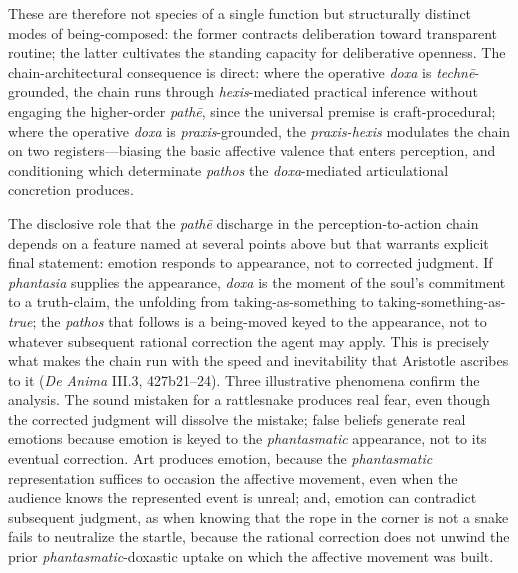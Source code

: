 \documentclass{article}
\begin{document}
These are therefore not species of a single function but structurally distinct modes of being-composed: the former contracts deliberation toward transparent routine; the latter cultivates the standing capacity for deliberative openness. The chain-architectural consequence is direct: where the operative \textit{doxa} is \textit{technē}-grounded, the chain runs through \textit{hexis}-mediated practical inference without engaging the higher-order \textit{pathē}, since the universal premise is craft-procedural; where the operative \textit{doxa} is \textit{praxis}-grounded, the \textit{praxis-hexis} modulates the chain on two registers---biasing the basic affective valence that enters perception, and conditioning which determinate \textit{pathos} the \textit{doxa}-mediated articulational concretion produces.

The disclosive role that the \textit{pathē} discharge in the perception-to-action chain depends on a feature named at several points above but that warrants explicit final statement: emotion responds to appearance, not to corrected judgment. If \textit{phantasia} supplies the appearance, \textit{doxa} is the moment of the soul's commitment to a truth-claim, the unfolding from taking-as-something to taking-something-as-\textit{true}; the \textit{pathos} that follows is a being-moved keyed to the appearance, not to whatever subsequent rational correction the agent may apply. This is precisely what makes the chain run with the speed and inevitability that Aristotle ascribes to it (\textit{De Anima} III.3, 427b21--24). Three illustrative phenomena confirm the analysis. The sound mistaken for a rattlesnake produces real fear, even though the corrected judgment will dissolve the mistake; false beliefs generate real emotions because emotion is keyed to the \textit{phantasmatic} appearance, not to its eventual correction. Art produces emotion, because the \textit{phantasmatic} representation suffices to occasion the affective movement, even when the audience knows the represented event is unreal; and, emotion can contradict subsequent judgment, as when knowing that the rope in the corner is not a snake fails to neutralize the startle, because the rational correction does not unwind the prior \textit{phantasmatic}-doxastic uptake on which the affective movement was built.
\end{document}
